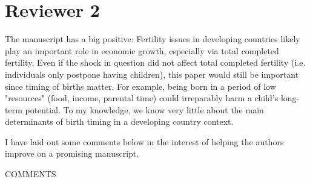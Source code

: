 \documentclass[letterpaper,12pt]{article}
\begin{document}


\newpage

\section*{Reviewer 2}


The manuscript has a big positive: Fertility issues in developing
countries likely play an important role in economic growth, especially
via total completed fertility. Even if the shock in question did not
affect total completed fertility (i.e. individuals only postpone having
children), this paper would still be important since timing of births
matter. For example, being born in a period of low "resources" (food,
income, parental time) could irreparably harm a child's long-term
potential. To my knowledge, we know very little about the main
determinants of birth timing in a developing country context.

I have laid out some comments below in the interest of helping the
authors improve on a promising manuscript.


COMMENTS
\end{document}
